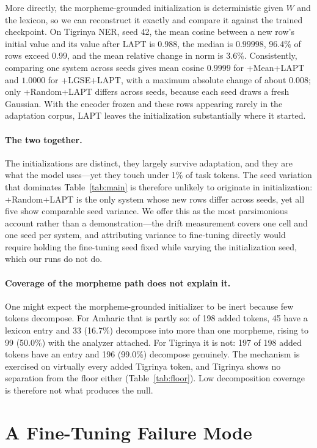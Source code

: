 \documentclass[11pt]{article}
\begin{document}
More directly, the morpheme-grounded initialization is deterministic given
$W$ and the lexicon, so we can reconstruct it exactly and compare it against
the trained checkpoint. On Tigrinya NER, seed 42, the mean cosine between a
new row's initial value and its value after LAPT is $0.988$, the median is
$0.99998$, 96.4\% of rows exceed $0.99$, and the mean relative change in
norm is 3.6\%. Consistently, comparing one system across seeds gives mean
cosine $0.9999$ for +Mean+LAPT and $1.0000$ for +LGSE+LAPT, with a maximum
absolute change of about $0.008$; only +Random+LAPT differs across seeds,
because each seed draws a fresh Gaussian. With the encoder frozen and these
rows appearing rarely in the adaptation corpus, LAPT leaves the
initialization substantially where it started.

\paragraph{The two together.} The initializations are distinct, they largely
survive adaptation, and they are what the model uses---yet they touch under
1\% of task tokens. The seed variation that dominates Table~\ref{tab:main} is
therefore unlikely to originate in initialization: +Random+LAPT is the only
system whose new rows differ across seeds, yet all five show comparable seed
variance. We offer this as the most parsimonious account rather than a
demonstration---the drift measurement covers one cell and one seed per
system, and attributing variance to fine-tuning directly would require
holding the fine-tuning seed fixed while varying the initialization seed,
which our runs do not do.

\paragraph{Coverage of the morpheme path does not explain it.} One might
expect the morpheme-grounded initializer to be inert because few tokens
decompose. For Amharic that is partly so: of 198 added tokens, 45 have a
lexicon entry and 33 (16.7\%) decompose into more than one morpheme, rising
to 99 (50.0\%) with the analyzer attached. For Tigrinya it is not: 197 of 198
added tokens have an entry and 196 (99.0\%) decompose genuinely. The
mechanism is exercised on virtually every added Tigrinya token, and Tigrinya
shows no separation from the floor either (Table~\ref{tab:floor}). Low
decomposition coverage is therefore not what produces the null.

\section{A Fine-Tuning Failure Mode}
\label{sec:degenerate}
\end{document}
